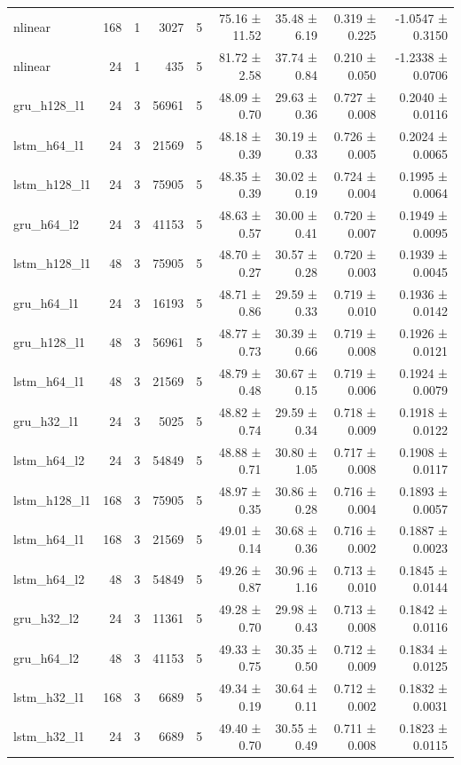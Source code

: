 \begin{table}[htbp]
\begin{tabular}{lrrrrrrrr}
nlinear & 168 & 1 & 3027 & 5 & 75.16 ± 11.52 & 35.48 ± 6.19 & 0.319 ± 0.225 & -1.0547 ± 0.3150 \\
nlinear & 24 & 1 & 435 & 5 & 81.72 ± 2.58 & 37.74 ± 0.84 & 0.210 ± 0.050 & -1.2338 ± 0.0706 \\
gru\_h128\_l1 & 24 & 3 & 56961 & 5 & 48.09 ± 0.70 & 29.63 ± 0.36 & 0.727 ± 0.008 & 0.2040 ± 0.0116 \\
lstm\_h64\_l1 & 24 & 3 & 21569 & 5 & 48.18 ± 0.39 & 30.19 ± 0.33 & 0.726 ± 0.005 & 0.2024 ± 0.0065 \\
lstm\_h128\_l1 & 24 & 3 & 75905 & 5 & 48.35 ± 0.39 & 30.02 ± 0.19 & 0.724 ± 0.004 & 0.1995 ± 0.0064 \\
gru\_h64\_l2 & 24 & 3 & 41153 & 5 & 48.63 ± 0.57 & 30.00 ± 0.41 & 0.720 ± 0.007 & 0.1949 ± 0.0095 \\
lstm\_h128\_l1 & 48 & 3 & 75905 & 5 & 48.70 ± 0.27 & 30.57 ± 0.28 & 0.720 ± 0.003 & 0.1939 ± 0.0045 \\
gru\_h64\_l1 & 24 & 3 & 16193 & 5 & 48.71 ± 0.86 & 29.59 ± 0.33 & 0.719 ± 0.010 & 0.1936 ± 0.0142 \\
gru\_h128\_l1 & 48 & 3 & 56961 & 5 & 48.77 ± 0.73 & 30.39 ± 0.66 & 0.719 ± 0.008 & 0.1926 ± 0.0121 \\
lstm\_h64\_l1 & 48 & 3 & 21569 & 5 & 48.79 ± 0.48 & 30.67 ± 0.15 & 0.719 ± 0.006 & 0.1924 ± 0.0079 \\
gru\_h32\_l1 & 24 & 3 & 5025 & 5 & 48.82 ± 0.74 & 29.59 ± 0.34 & 0.718 ± 0.009 & 0.1918 ± 0.0122 \\
lstm\_h64\_l2 & 24 & 3 & 54849 & 5 & 48.88 ± 0.71 & 30.80 ± 1.05 & 0.717 ± 0.008 & 0.1908 ± 0.0117 \\
lstm\_h128\_l1 & 168 & 3 & 75905 & 5 & 48.97 ± 0.35 & 30.86 ± 0.28 & 0.716 ± 0.004 & 0.1893 ± 0.0057 \\
lstm\_h64\_l1 & 168 & 3 & 21569 & 5 & 49.01 ± 0.14 & 30.68 ± 0.36 & 0.716 ± 0.002 & 0.1887 ± 0.0023 \\
lstm\_h64\_l2 & 48 & 3 & 54849 & 5 & 49.26 ± 0.87 & 30.96 ± 1.16 & 0.713 ± 0.010 & 0.1845 ± 0.0144 \\
gru\_h32\_l2 & 24 & 3 & 11361 & 5 & 49.28 ± 0.70 & 29.98 ± 0.43 & 0.713 ± 0.008 & 0.1842 ± 0.0116 \\
gru\_h64\_l2 & 48 & 3 & 41153 & 5 & 49.33 ± 0.75 & 30.35 ± 0.50 & 0.712 ± 0.009 & 0.1834 ± 0.0125 \\
lstm\_h32\_l1 & 168 & 3 & 6689 & 5 & 49.34 ± 0.19 & 30.64 ± 0.11 & 0.712 ± 0.002 & 0.1832 ± 0.0031 \\
lstm\_h32\_l1 & 24 & 3 & 6689 & 5 & 49.40 ± 0.70 & 30.55 ± 0.49 & 0.711 ± 0.008 & 0.1823 ± 0.0115 \\

\end{tabular}
\end{table}
